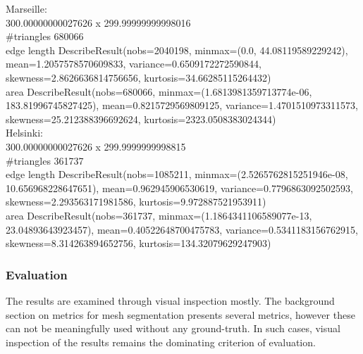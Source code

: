 \documentclass{kththesis}
\begin{document}
Marseille:\\
300.00000000027626  x  299.99999999998016\\
#triangles 680066\\
edge length DescribeResult(nobs=2040198, minmax=(0.0, 44.08119589229242), mean=1.2057578570609833, variance=0.6509172272590844, skewness=2.8626636814756656, kurtosis=34.66285115264432)\\
area DescribeResult(nobs=680066, minmax=(1.6813981359713774e-06, 183.81996745827425), mean=0.8215729569809125, variance=1.4701510973311573, skewness=25.212388396692624, kurtosis=2323.0508383024344)\\

Helsinki:\\
300.00000000027626  x  299.9999999998815\\
#triangles 361737\\
edge length DescribeResult(nobs=1085211, minmax=(2.5265762815251946e-08, 10.656968228647651), mean=0.962945906530619, variance=0.7796863092502593, skewness=2.293563171981586, kurtosis=9.972887521953911)\\
area DescribeResult(nobs=361737, minmax=(1.1864341106589077e-13, 23.04893643923457), mean=0.40522648700475783, variance=0.5341183156762915, skewness=8.314263894652756, kurtosis=134.32079629247903)\\

\subsubsection{Evaluation}
The results are examined through visual inspection mostly. The background section on metrics for mesh segmentation presents several metrics, however these can not be meaningfully used without any ground-truth. In such cases, visual inspection of the results remains the dominating criterion of evaluation.  
\end{document}
